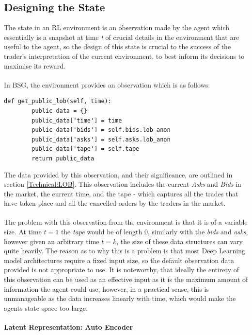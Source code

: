 \documentclass[ %
                    author={Ashwinder Khurana},
                supervisor={Prof Dave Cliff},
                    degree={MEng},
                     title={The Deeply Reinforced Trader},
                  subtitle={},
                      type={enterprise},
                      year={2020} ]{dissertation}
\begin{document}
{\subsection{Designing the State}

The state in an RL environment is an observation made by the agent which essentially is a snapshot at time \textit{t} of crucial details in the environment that are useful to the agent, so the design of this state is crucial to the success of the trader's interpretation of the current environment, to best inform its decisions to maximise its reward. 
\\
\\
\noindent
In BSG, the environment provides an observation which is as follows:


\begin{lstlisting}[label=BSG-Obs, caption = BSG Environment Observation: LOB]
def get_public_lob(self, time):
        public_data = {}
        public_data['time'] = time
        public_data['bids'] = self.bids.lob_anon
        public_data['asks'] = self.asks.lob_anon
        public_data['tape'] = self.tape
        return public_data
\end{lstlisting}
\noindent
The data provided by this observation, and their significance, are outlined in section \ref{Technical:LOB}. This observation includes the current \textit{Asks} and \textit{Bids} in the market, the current time, and the tape - which captures all the trades that have taken place and all the cancelled orders by the traders in the market.
\\
\\
The problem with this observation from the environment is that it is of a variable size. At time $t=1$ the \textit{tape} would be of length 0, similarly with the \textit{bids} and \textit{asks}, however given an arbitrary time $t = k$, the size of these data structures can vary quite heavily. The reason as to why this is a problem is that most Deep Learning model architectures require a fixed input size, so the default observation data provided is not appropriate to use. It is noteworthy, that ideally the entirety of this observation can be used as an effective input as it is the maximum amount of information the agent could use, however, in a practical sense, this is unmanageable as the data increases linearly with time, which would make the agents state space too large.
\\
\\
\textbf{Latent Representation: Auto Encoder}
\\
}
\end{document}
